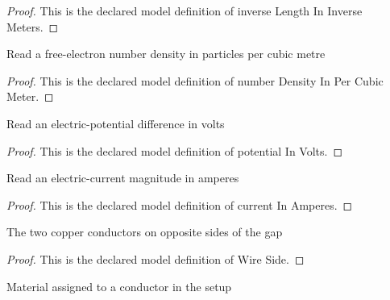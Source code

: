 \begin{proof}
  This is the declared model definition of inverse Length In Inverse Meters.
\end{proof}
\begin{definition}
  \label{def:physics:phyx-mini-0616:phyxminiproblems-problemphyxmini0616-numberdensityinpercubicmeter}
  Read a free-electron number density in particles per cubic metre
\end{definition}
\begin{proof}
  This is the declared model definition of number Density In Per Cubic Meter.
\end{proof}
\begin{definition}
  \label{def:physics:phyx-mini-0616:phyxminiproblems-problemphyxmini0616-potentialinvolts}
  Read an electric-potential difference in volts
\end{definition}
\begin{proof}
  This is the declared model definition of potential In Volts.
\end{proof}
\begin{definition}
  \label{def:physics:phyx-mini-0616:phyxminiproblems-problemphyxmini0616-currentinamperes}
  Read an electric-current magnitude in amperes
\end{definition}
\begin{proof}
  This is the declared model definition of current In Amperes.
\end{proof}
\begin{definition}
  \label{def:physics:phyx-mini-0616:phyxminiproblems-problemphyxmini0616-wireside}
  The two copper conductors on opposite sides of the gap
\end{definition}
\begin{proof}
  This is the declared model definition of Wire Side.
\end{proof}
\begin{definition}
  \label{def:physics:phyx-mini-0616:phyxminiproblems-problemphyxmini0616-wirematerial}
  Material assigned to a conductor in the setup
\end{definition}
